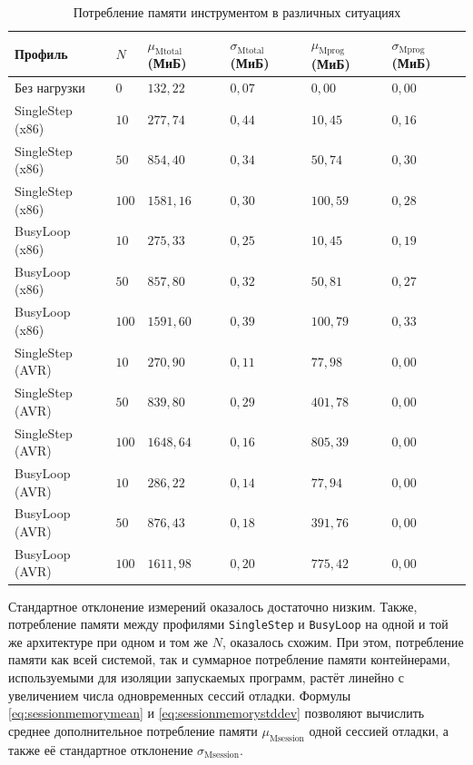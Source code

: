 \documentclass[a4paper,article,14pt]{extarticle}
\begin{document}
\begin{table}[ht]
\small
    \begin{tabular}{p{3cm}p{1cm}p{2.5cm}p{2.5cm}p{2.5cm}p{2.5cm}}
\toprule
    Профиль & $N$ & $\mu_\mathrm{Mtotal}$ (МиБ) & $\sigma_\mathrm{Mtotal}$ (МиБ) &
    $\mu_\mathrm{Mprog}$ (МиБ) & $\sigma_\mathrm{Mprog}$ (МиБ) \\
    \midrule
Без нагрузки & $0$ & $132{,}22$ & $0{,}07$ & $0{,}00$ & $0{,}00$ \\
SingleStep (x86) & $10$ & $277{,}74$ & $0{,}44$ & $10{,}45$ & $0{,}16$ \\
SingleStep (x86) & $50$ & $854{,}40$ & $0{,}34$ & $50{,}74$ & $0{,}30$ \\
SingleStep (x86) & $100$ & $1581{,}16$ & $0{,}30$ & $100{,}59$ & $0{,}28$ \\
BusyLoop (x86) & $10$ & $275{,}33$ & $0{,}25$ & $10{,}45$ & $0{,}19$ \\
BusyLoop (x86) & $50$ & $857{,}80$ & $0{,}32$ & $50{,}81$ & $0{,}27$ \\
BusyLoop (x86) & $100$ & $1591{,}60$ & $0{,}39$ & $100{,}79$ & $0{,}33$ \\
SingleStep (AVR) & $10$ & $270{,}90$ & $0{,}11$ & $77{,}98$ & $0{,}00$ \\
SingleStep (AVR) & $50$ & $839{,}80$ & $0{,}29$ & $401{,}78$ & $0{,}00$ \\
SingleStep (AVR) & $100$ & $1648{,}64$ & $0{,}16$ & $805{,}39$ & $0{,}00$ \\
BusyLoop (AVR) & $10$ & $286{,}22$ & $0{,}14$ & $77{,}94$ & $0{,}00$ \\
BusyLoop (AVR) & $50$ & $876{,}43$ & $0{,}18$ & $391{,}76$ & $0{,}00$ \\
BusyLoop (AVR) & $100$ & $1611{,}98$ & $0{,}20$ & $775{,}42$ & $0{,}00$ \\ \bottomrule
    \end{tabular}
\caption{\label{table:memorymeasurements}Потребление памяти инструментом в различных ситуациях}
\normalsize
\end{table}

Стандартное отклонение измерений оказалось достаточно низким. Также, потребление памяти между профилями \texttt{SingleStep} и \texttt{BusyLoop} на одной и той же архитектуре при одном и том же $N$, оказалось схожим. При этом, потребление памяти как всей системой, так и суммарное потребление памяти контейнерами, используемыми для изоляции запускаемых программ, растёт линейно с увеличением числа одновременных сессий отладки. Формулы \ref{eq:sessionmemorymean} и \ref{eq:sessionmemorystddev} позволяют вычислить среднее дополнительное потребление памяти $\mu_\mathrm{Msession}$ одной сессией отладки, а также её стандартное отклонение $\sigma_\mathrm{Msession}$.
\end{document}
